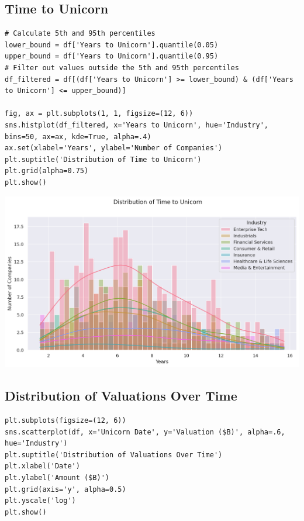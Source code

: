 \documentclass[a4paper,12pt]{article}
\begin{document}
\subsection{Time to Unicorn}
\label{sec:orgaa07df8}

\begin{verbatim}
# Calculate 5th and 95th percentiles
lower_bound = df['Years to Unicorn'].quantile(0.05)
upper_bound = df['Years to Unicorn'].quantile(0.95)
# Filter out values outside the 5th and 95th percentiles
df_filtered = df[(df['Years to Unicorn'] >= lower_bound) & (df['Years to Unicorn'] <= upper_bound)]

fig, ax = plt.subplots(1, 1, figsize=(12, 6))
sns.histplot(df_filtered, x='Years to Unicorn', hue='Industry', bins=50, ax=ax, kde=True, alpha=.4)
ax.set(xlabel='Years', ylabel='Number of Companies')
plt.suptitle('Distribution of Time to Unicorn')
plt.grid(alpha=0.75)
plt.show()
\end{verbatim}

\begin{center}
\includegraphics[width=.9\linewidth]{./.ob-jupyter/3c56a433ece1ec2cf4e83e3ba320a0aee5c2ee70.png}
\label{}
\end{center}
\subsection{Distribution of Valuations Over Time}
\label{sec:org7b7a456}

\begin{verbatim}
plt.subplots(figsize=(12, 6))
sns.scatterplot(df, x='Unicorn Date', y='Valuation ($B)', alpha=.6, hue='Industry')
plt.suptitle('Distribution of Valuations Over Time')
plt.xlabel('Date')
plt.ylabel('Amount ($B)')
plt.grid(axis='y', alpha=0.5)
plt.yscale('log')
plt.show()
\end{verbatim}
\end{document}
